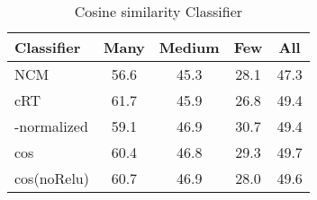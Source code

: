 \documentclass[dvipsnames]{article} \usepackage{iclr2020_conference, times}
\newcommand{\ncm}{NCM\xspace}
\newcommand{\retrain}{cRT\xspace}
\newcommand{\wnorm}{-normalized\xspace}
\begin{document}
\begin{table}[h]
\small
\caption{Cosine similarity Classifier}
\label{tab:cos}
\begin{center}
\begin{tabular}{l|cccc}
\toprule
Classifier & Many & Medium & Few & All \\
\midrule
\ncm & 56.6 & 45.3 & 28.1 & 47.3 \\
\retrain & 61.7 & 45.9 & 26.8 & 49.4 \\
\wnorm & 59.1 & 46.9 & 30.7 & 49.4 \\
\midrule
cos & 60.4 & 46.8 & 29.3 & 49.7 \\
cos(noRelu) & 60.7 & 46.9 & 28.0 & 49.6 \\
\bottomrule
\end{tabular}
\end{center}
\end{table}




 
\end{document}
